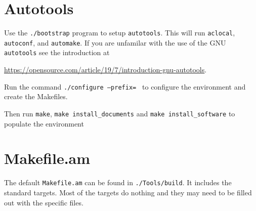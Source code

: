 
\section{Autotools}
Use the \texttt{./bootstrap} program to setup \texttt{autotools}.
This will run \texttt{aclocal}, \texttt{autoconf}, and
\texttt{automake}.  If you are unfamilar with the use of the GNU
\texttt{autotools} see the introduction at

\url{https://opensource.com/article/19/7/introduction-gnu-autotools}.

Run the command \texttt{./configure --prefix=~} to configure the
environment and create the Makefiles.

Then run \texttt{make}, \texttt{make install\_documents} and
\texttt{make install\_software} to populate the environment

\section{Makefile.am}

The default \texttt{Makefile.am} can be found in
\texttt{./Tools/build}.  It includes the standard targets.  Most of the
targets do nothing and they may need to be filled out with the
specific files.
